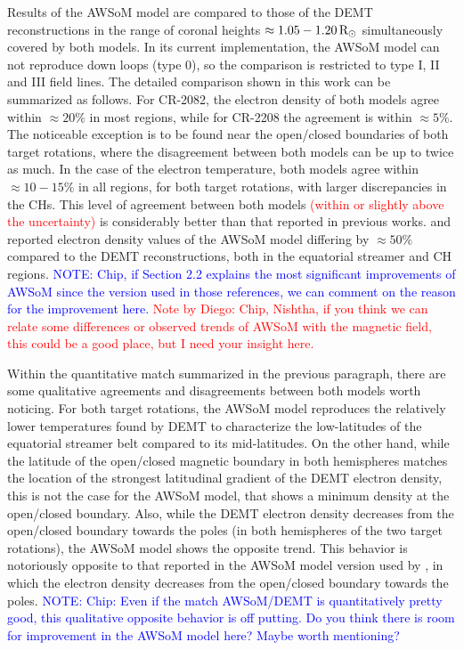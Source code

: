 \documentclass[namedreferences]{solarphysics}
\newcommand{\mrsun}{{\rm R_\odot}}
\def\diego#1{\textcolor{red}{#1}}
\def\notebyalbert#1{\textcolor{blue}{NOTE: #1}}
\begin{document}
\begin{article}
Results of the AWSoM model are compared to those of the DEMT reconstructions in the range of coronal heights $\approx 1.05-1.20\,\mrsun$ simultaneously covered by both models. In its current implementation, the AWSoM model can not reproduce down loops (type 0), so the comparison is restricted to type I, II and III field lines. The detailed comparison shown in this work can be summarized as follows. For CR-2082, the electron density of both models agree within $\approx 20\%$ {in most regions}, while for CR-2208 the agreement is within $\approx 5\%$. {The noticeable exception is to be found near the open/closed boundaries of both target rotations, where the disagreement between both models can be up to twice as much.} In the case of the electron temperature, both models agree within $\approx 10-15\%$ in all regions, for both target rotations{, with larger discrepancies in the CHs.} This level of agreement between both models \diego{(within or slightly above the uncertainty)} is considerably better than that reported in previous works. \citet{jin_2012} and \citet{oran_2015} reported electron density values of the AWSoM model {differing by $\approx 50\%$ compared to the DEMT reconstructions, both in the equatorial streamer and CH regions.} \notebyalbert{Chip, if Section 2.2 explains the most significant improvements of AWSoM since the version used in those references, we can comment on the reason for the improvement here.}
\diego{Note by Diego: Chip, Nishtha, if you think we can relate some differences or observed trends of AWSoM with the magnetic field, this could be a good place, but I need your insight here.}

{Within the quantitative match summarized in the previous paragraph, there are some qualitative agreements and disagreements between both models worth noticing. For both target rotations, the AWSoM model reproduces the relatively lower temperatures found by DEMT to characterize the low-latitudes of the equatorial streamer belt compared to its mid-latitudes. On the other hand, while the latitude of the open/closed magnetic boundary in both hemispheres matches the location of the strongest latitudinal gradient of the DEMT electron density, this is not the case for the AWSoM model, that shows a minimum density at the open/closed boundary. Also, while the DEMT electron density decreases from the open/closed boundary towards the poles (in both hemispheres of the two target rotations), the AWSoM model shows the opposite trend. This behavior is notoriously opposite to that reported in the AWSoM model version used by \citet{oran_2015}, in which the electron density decreases from the open/closed boundary towards the poles.} \notebyalbert{Chip: Even if the match AWSoM/DEMT is quantitatively pretty good, this qualitative opposite behavior is off putting. Do you think there is room for improvement in the AWSoM model here? Maybe worth mentioning?}



\end{article}
\end{document}
